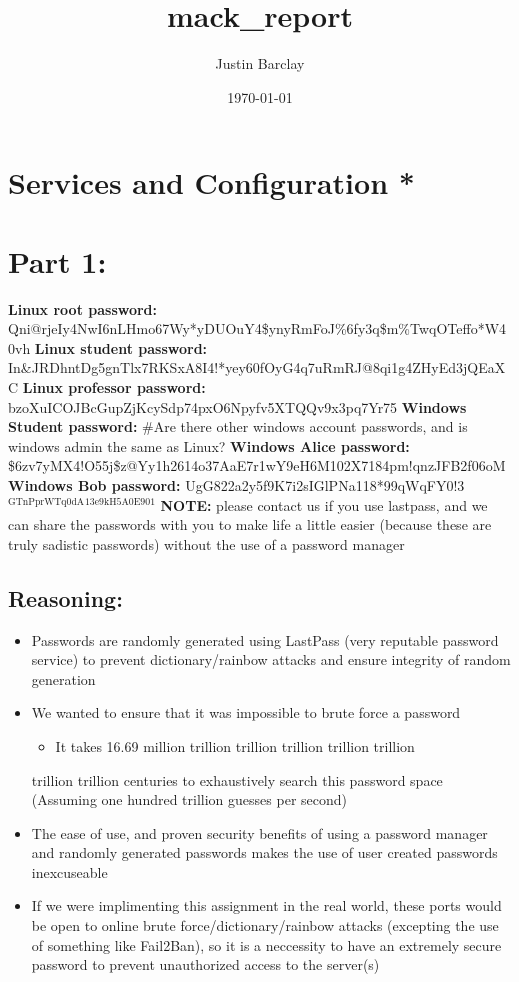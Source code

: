 \documentclass[11pt]{article}
\author{Justin Barclay}
\date{\today}
\title{mack\_report}
\begin{document}
\maketitle
\tableofcontents

\section{Services and Configuration *}
\label{sec-1}

\section{Part 1:}
\label{sec-2}
\textbf{Linux root password:}
Qni@rjeIy4NwI6nLHmo67Wy*yDUOuY4\$ynyRmFoJ\%6fy3q\$m\%TwqOTeffo*W40vh
\textbf{Linux student password:}
In\&JRDhntDg5gnTlx7RKSxA8I4!*yey60fOyG4q7uRmRJ@8qi1g4ZHyEd3jQEaXC
\textbf{Linux professor password:}
bzoXuICOJBcGupZjKcySdp74pxO6Npyfv5XTQQv9x3pq7Yr75
\textbf{Windows Student password:}
\#Are there other windows account passwords, and is windows admin the same as Linux?
\textbf{Windows Alice password:}
\$6zv7yMX4!O55j\$z@Yy1h2614o37AaE7r1wY9eH6M102X7184pm!qnzJFB2f06oM
\textbf{Windows Bob password:}
UgG822a2y5f9K7i2sIGlPNa118*99qWqFY0!3$^{\text{GTnPprWTq0dA}}$$^{\text{13e9kH5A0E901}}$
\textbf{NOTE:} please contact us if you use lastpass, and we can share the passwords
with you to make life a little easier (because these are truly sadistic
passwords) without the use of a password manager
\subsection{Reasoning:}
\label{sec-2-1}
\begin{itemize}
\item Passwords are randomly generated using LastPass (very reputable password
service) to prevent dictionary/rainbow attacks and ensure integrity of random
generation
\item We wanted to ensure that it was impossible to brute force a password
\begin{itemize}
\item It takes 16.69 million trillion trillion trillion trillion trillion
\end{itemize}
trillion trillion centuries to exhaustively search this password space
(Assuming one hundred trillion guesses per second)
\item The ease of use, and proven security benefits of using a password manager
and randomly generated passwords makes the use of user created passwords
inexcuseable
\item If we were implimenting this assignment in the real world, these ports
would be open to online brute force/dictionary/rainbow attacks (excepting the use
of something like Fail2Ban), so it is a neccessity to have an extremely
secure password to prevent unauthorized access to the server(s)
\end{itemize}
\end{document}
